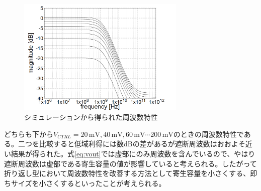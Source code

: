 \documentclass[twocolumn]{jsarticle}
\begin{document}
    \begin{figure}[H]
        \begin{center}
            \includegraphics*[width = 80mm]{figures/vout_ac_simulation_monochrome.PNG}
            \caption{シミュレーションから得られた周波数特性}
            \label{fig:vout_sim}
        \end{center}
    \end{figure}
    \clearpage
    どちらも下から$V_{CTRL}=20\,\mathrm{mV},40\,\mathrm{mV},60\,\mathrm{mV}\cdots200\,\mathrm{mV}$のときの周波数特性である。二つを比較すると低域利得には数dBの差があるが遮断周波数はおおよそ近い結果が得られた。式\eqref{eq:vout}では虚部にのみ周波数を含んでいるので、やはり遮断周波数は虚部である寄生容量の値が影響していると考えられる。したがって折り返し型において周波数特性を改善する方法として寄生容量を小さくする、即ちサイズを小さくするといったことが考えられる。
\end{document}
